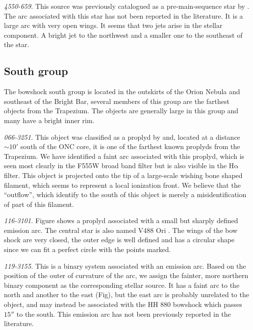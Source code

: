 \documentclass[apj, twocolumn]{aastex63}
\newcommand\ha{\ensuremath{\mathrm{H\alpha}}}
\renewcommand\clearpage{}
\begin{document}
\textit{4550-659.} This source was previously catalogued as a pre-main-sequence
star by \citet{Parihar:2009}. The arc associated with this star has not been
reported in the literature. It is a large arc with very open wings. It seems
that two jets arise in the stellar component. A bright jet to the northwest
and a smaller one to the southeast of the star.  


\clearpage
\subsection{South group}
\label{sec:s-group}



The bowshock south group is located in the outskirts of the Orion
Nebula and southeast of the Bright Bar, several members of this
group are the farthest objects from the Trapezium. The objects
are generally large in this group and many have a bright inner rim.   

\textit{066-3251.} This object was classified as a proplyd
by \citet{Ricci:2008a} and, located at a distance \(\sim 10'\)
south of the ONC core, it is one of the farthest known proplyds
from the Trapezium. We have identified a faint arc associated
with this proplyd, which is seen most clearly in the F555W broad
band filter but is also visible in the \ha{} filter. This object
is projected onto the tip of a large-scale wishing bone shaped
filament, which seems to represent a local ionization front.
We believe that the ``outflow'', which \citet{Ricci:2008a} identify
to the south of this object is merely a misidentification of
part of this filament.  

\textit{116-3101.} Figure shows a proplyd associated with a small
but sharply defined emission arc.  The central star is also
named V488 Ori \citep{Bally:2006a}. The wings of the bow shock
are very closed, the outer edge is well defined and has a circular
shape since we can fit a perfect circle with the points marked.  

\textit{119-3155.} This is a binary system associated with an
emission arc. Based on the position of the outer of curvature of
the arc, we assign the fainter, more northern binary component as
the corresponding stellar source. It has a faint arc to the north
and another to the east (Fig), but  the east arc is probably
unrelated to the object, and may instead be associated with the
HH 880 bowshock which passes \(15''\) to the south. This emission
arc has not been previously reported in the literature.     
\end{document}
